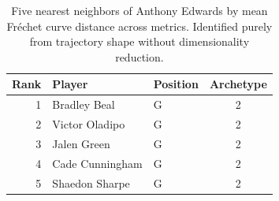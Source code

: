 \begin{table}[htbp]
  \centering\small
  \begin{tabular}{rllc}
    \toprule
    Rank & Player & Position & Archetype \\
    \midrule
    1 & Bradley Beal & G & 2 \\
    2 & Victor Oladipo & G & 2 \\
    3 & Jalen Green & G & 2 \\
    4 & Cade Cunningham & G & 2 \\
    5 & Shaedon Sharpe & G & 2 \\
    \bottomrule
  \end{tabular}
  \caption{Five nearest neighbors of Anthony Edwards by mean Fr\'{e}chet curve distance across metrics. Identified purely from trajectory shape without dimensionality reduction.}
  \label{tab:Anthony_Edwards_frechet_curve_neighbors}
\end{table}

